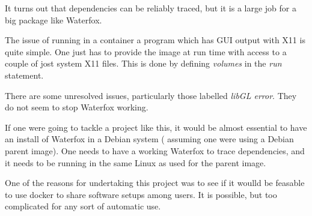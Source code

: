 \documentclass{article}  %
\begin{document}
It turns out that dependencies can be reliably traced, but it is a large job for a big package like Waterfox.

The issue of running in a container a program which has GUI output with X11 is quite simple. One just has to provide the image at run time with access to a couple of jost system X11 files.  This is done by defining {\em volumes} in the {\em run} statement.

There are some unresolved issues, particularly those labelled {\em libGL error}. They do not seem to stop Waterfox working.

If one were going to tackle a project like this, it would be almost essential to have an install of Waterfox in a  Debian system ( assuming one were using a Debian parent image). One needs to have a working Waterfox to trace dependencies,  and it needs to be running in the same Linux as used for the parent image. 

One of the reasons for undertaking this project was to see if it woulld be feasable to use docker to share software setups among users.  It is possible, but too complicated for any sort of automatic use. 
\end{document}
